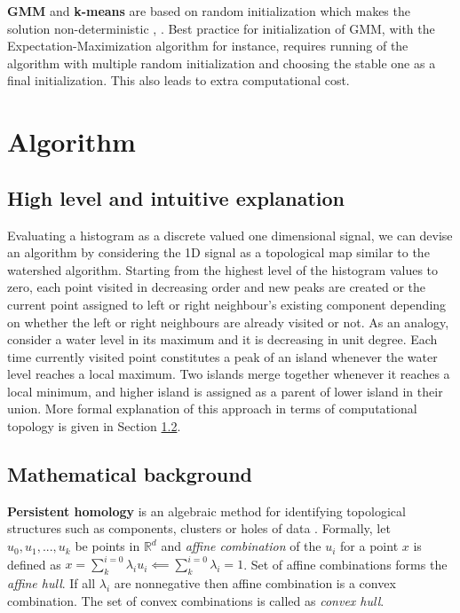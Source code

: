 \documentclass[12pt]{extarticle}
\begin{document}
\textbf{GMM} and \textbf{k-means} are based on random initialization which makes the solution non-deterministic \cite{duda2012pattern}, \cite{bishop2006pattern}. Best practice for initialization of GMM, with the Expectation-Maximization algorithm for instance, requires running of the algorithm with multiple random initialization and choosing the stable one as a final initialization. This also leads to extra computational cost. 

\section{Algorithm}

\subsection{High level and intuitive explanation}
Evaluating a histogram as a discrete valued one dimensional signal, we can devise an algorithm by considering the 1D signal as a topological map similar to the watershed algorithm. Starting from the highest level of the histogram values to zero, each point visited in decreasing order and new peaks are created or the current point assigned to left or right neighbour's existing component depending on whether the left or right neighbours are already visited or not. As an analogy, consider a water level in its maximum and it is decreasing in unit degree. Each time currently visited point constitutes a peak of an island whenever the water level reaches a local maximum. Two islands merge together whenever it reaches a local minimum, and higher island is assigned as a parent of lower island in their union. More formal explanation of this approach in terms of computational topology is given in Section \ref{math_background}.
\subsection{Mathematical background} \label{math_background}
\textbf{Persistent homology} is an algebraic method for identifying topological structures such as components, clusters or holes of data \cite{edelsbrunner2010computational}. Formally, let $ u_0, u_1,..., u_k $ be points in $ \mathbb{R}^d $ and \textit{affine combination} of the $u_i$ for a point $x$ is defined as $x = \sum_{k}^{i=0} \lambda_i u_i \impliedby  \sum_{k}^{i=0}\lambda_i = 1 $.
Set of affine combinations forms the \textit{affine hull}. If all $\lambda_i$ are nonnegative then affine combination is a convex combination. The set of convex combinations is called as \textit{convex hull}.
\end{document}
